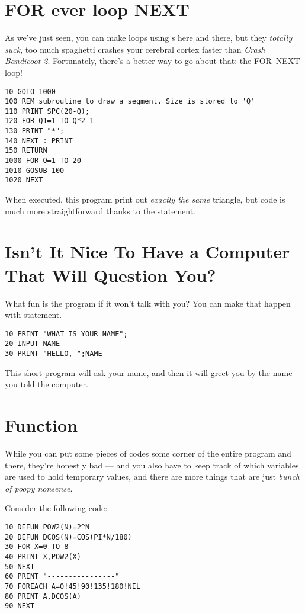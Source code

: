 \section[FOR--NEXT Loop]{FOR ever loop NEXT}

As we've just seen, you can make loops using s here and there, but they \emph{totally suck}, too much spaghetti crashes your cerebral cortex faster than \emph{Crash Bandicoot 2}. Fortunately, there's a better way to go about that: the FOR--NEXT loop!

\begin{lstlisting}
10 GOTO 1000
100 REM subroutine to draw a segment. Size is stored to 'Q'
110 PRINT SPC(20-Q);
120 FOR Q1=1 TO Q*2-1
130 PRINT "*";
140 NEXT : PRINT
150 RETURN
1000 FOR Q=1 TO 20
1010 GOSUB 100
1020 NEXT
\end{lstlisting}

When executed, this program print out \emph{exactly the same} triangle, but code is much more straightforward thanks to the  statement.

\section[Get User INPUT]{Isn't It Nice To Have a Computer That Will Question You?}

What fun is the program if it won't talk with you? You can make that happen with  statement.

\begin{lstlisting}
10 PRINT "WHAT IS YOUR NAME";
20 INPUT NAME
30 PRINT "HELLO, ";NAME
\end{lstlisting}

This short program will ask your name, and then it will greet you by the name you told the computer.

\section[Function]{Function}

While you can put some pieces of codes some corner of the entire program and  there, they're honestly bad --- and you also have to keep track of which variables are used to hold temporary values, and there are more things that are just \emph{bunch of poopy nonsense}.

Consider the following code:

\begin{lstlisting}
10 DEFUN POW2(N)=2^N
20 DEFUN DCOS(N)=COS(PI*N/180)
30 FOR X=0 TO 8
40 PRINT X,POW2(X)
50 NEXT
60 PRINT "----------------"
70 FOREACH A=0!45!90!135!180!NIL
80 PRINT A,DCOS(A)
90 NEXT
\end{lstlisting}

